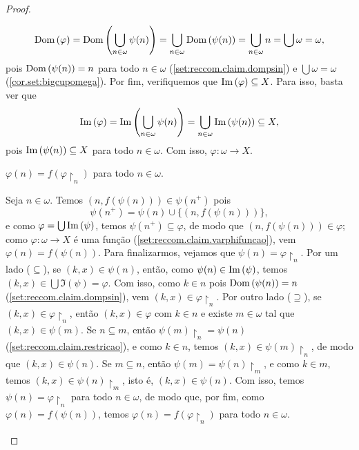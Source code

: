 \begin{proof}
\begin{midproof}
                \[
                    \operatorname{Dom}{(\varphi)} = \operatorname{Dom}{\left( \bigcup_{n \in \omega} \psi(n) \right)} = \bigcup_{n \in \omega} \operatorname{Dom}{(\psi(n))} = \bigcup_{n \in \omega} n = \bigcup \omega = \omega,
                \]
            pois $\operatorname{Dom}{(\psi(n))} = n$ para todo $n \in \omega$ (\cref{set:reccom.claim.dompsin}) e $\bigcup \omega = \omega$ (\cref{cor.set:bigcupomega}). Por fim, verifiquemos que $\operatorname{Im}{(\varphi)} \subseteq X$. Para isso, basta ver que
                \[
                    \operatorname{Im}{(\varphi)} = \operatorname{Im}{\left(\bigcup_{n \in \omega} \psi(n) \right)} = \bigcup_{n \in \omega} \operatorname{Im}{(\psi(n))} \subseteq X,
                \]
            pois $\operatorname{Im}{(\psi(n))} \subseteq X$ para todo $n \in \omega$. Com isso, $\varphi : \omega \to X$. \whiteproof
        \end{midproof}
        \begin{claim} \label{set:reccom.claim.propriedaderecursiva}
            $\varphi(n) = f(\varphi \restriction_n)$ para todo $n \in \omega$.
        \end{claim}
        \begin{midproof}
            Seja $n \in \omega$. Temos $(n, f(\psi(n))) \in \psi(n^+)$ pois 
                \[
                    \psi(n^+) = \psi(n) \cup \{ (n, f(\psi(n)))\},
                \]
            e como $\varphi = \bigcup \operatorname{Im}{(\psi)}$, temos $\psi(n^+) \subseteq \varphi$, de modo que $(n, f(\psi(n))) \in \varphi$; como $\varphi : \omega \to X$ é uma função (\cref{set:reccom.claim.varphifuncao}), vem  $\varphi(n) = f(\psi(n))$. Para finalizarmos, vejamos que $\psi(n) = \varphi \restriction_n$. Por um lado ($\subseteq$), se $(k,x) \in \psi(n)$, então, como $\psi(n) \in \operatorname{Im}{(\psi)}$, temos $(k,x) \in \bigcup \Im{(\psi)} = \varphi$. Com isso, como $k \in n$ pois $\operatorname{Dom}{(\psi(n))} = n$ (\cref{set:reccom.claim.dompsin}), vem $(k,x) \in \varphi \restriction_n$. Por outro lado ($\supseteq$), se $(k,x) \in \varphi \restriction_n$, então $(k,x) \in \varphi$ com $k \in n$ e existe $m \in \omega$ tal que $(k,x) \in \psi(m)$. Se $n \subseteq m$, então $\psi(m) \restriction_n = \psi(n)$ (\cref{set:reccom.claim.restricao}), e como $k \in n$, temos $(k,x) \in \psi(m) \restriction_n$, de modo que $(k,x) \in \psi(n)$. Se $m \subseteq n$, então $\psi(m) = \psi(n) \restriction_m$, e como $k \in m$, temos $(k,x) \in \psi(n) \restriction_m$, isto é, $(k,x) \in \psi(n)$. Com isso, temos $\psi(n) = \varphi \restriction_n$ para todo $n \in \omega$, de modo que, por fim, como $\varphi(n) = f(\psi(n))$, temos $\varphi(n) = f(\varphi \restriction_n)$ para todo $n \in \omega$. \whiteproof

\end{midproof}
\end{proof}
